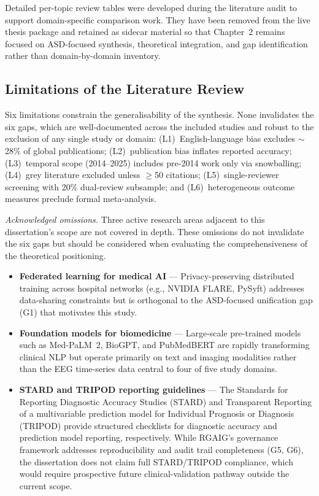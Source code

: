 Detailed per-topic review tables were developed during the literature audit to support domain-specific comparison work. They have been removed from the live thesis package and retained as sidecar material so that Chapter~2 remains focused on ASD-focused synthesis, theoretical integration, and gap identification rather than domain-by-domain inventory.

\subsection{Limitations of the Literature Review}

Six limitations constrain the generalisability of the synthesis. None invalidates the six gaps, which are well-documented across the included studies and robust to the exclusion of any single study or domain: (L1)~English-language bias excludes $\sim$28\% of global publications; (L2)~publication bias inflates reported accuracy; (L3)~temporal scope (2014--2025) includes pre-2014 work only via snowballing; (L4)~grey literature excluded unless $\geq$50 citations; (L5)~single-reviewer screening with 20\% dual-review subsample; and (L6)~heterogeneous outcome measures preclude formal meta-analysis.

\noindent\textit{Acknowledged omissions.} Three active research areas adjacent to this dissertation's scope are not covered in depth. These omissions do not invalidate the six gaps but should be considered when evaluating the comprehensiveness of the theoretical positioning.

\begin{itemize}[leftmargin=*, itemsep=3pt]
  \item \textbf{Federated learning for medical AI} --- Privacy-preserving distributed training across hospital networks (e.g., NVIDIA FLARE, PySyft) addresses data-sharing constraints but is orthogonal to the ASD-focused unification gap (G1) that motivates this study.
  \item \textbf{Foundation models for biomedicine} --- Large-scale pre-trained models such as Med-PaLM~2, BioGPT, and PubMedBERT are rapidly transforming clinical NLP but operate primarily on text and imaging modalities rather than the EEG time-series data central to four of five study domains.
  \item \textbf{STARD and TRIPOD reporting guidelines} --- The Standards for Reporting Diagnostic Accuracy Studies (STARD) and Transparent Reporting of a multivariable prediction model for Individual Prognosis or Diagnosis (TRIPOD) provide structured checklists for diagnostic accuracy and prediction model reporting, respectively. While RGAIG's governance framework addresses reproducibility and audit trail completeness (G5, G6), the dissertation does not claim full STARD/TRIPOD compliance, which would require prospective future clinical-validation pathway outside the current scope.
\end{itemize}

